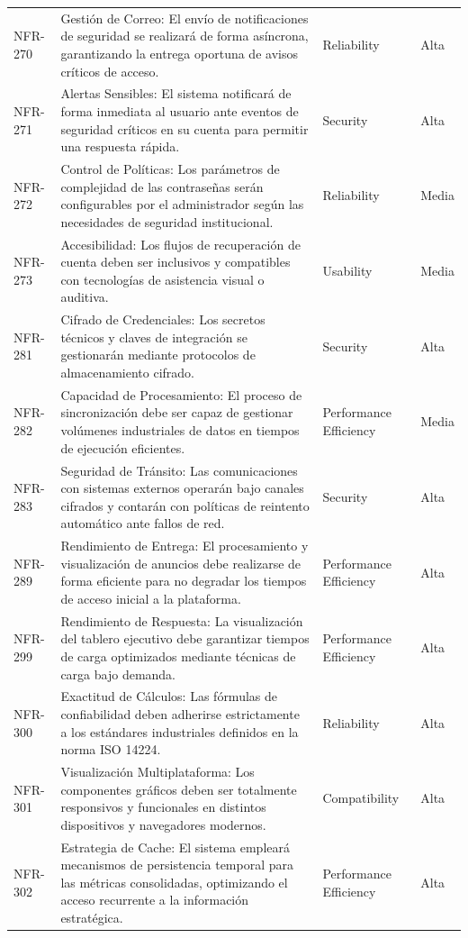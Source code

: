 \begin{longtable}{>{\raggedright\arraybackslash}p{} >{\raggedright\arraybackslash}p{} >{\raggedright\arraybackslash}p{} >{\raggedright\arraybackslash}p{}}
NFR-270 & Gestión de Correo: El envío de notificaciones de seguridad se realizará de forma asíncrona, garantizando la entrega oportuna de avisos críticos de acceso. & Reliability & Alta \\
NFR-271 & Alertas Sensibles: El sistema notificará de forma inmediata al usuario ante eventos de seguridad críticos en su cuenta para permitir una respuesta rápida. & Security & Alta \\
NFR-272 & Control de Políticas: Los parámetros de complejidad de las contraseñas serán configurables por el administrador según las necesidades de seguridad institucional. & Reliability & Media \\
NFR-273 & Accesibilidad: Los flujos de recuperación de cuenta deben ser inclusivos y compatibles con tecnologías de asistencia visual o auditiva. & Usability & Media \\
NFR-281 & Cifrado de Credenciales: Los secretos técnicos y claves de integración se gestionarán mediante protocolos de almacenamiento cifrado. & Security & Alta \\
NFR-282 & Capacidad de Procesamiento: El proceso de sincronización debe ser capaz de gestionar volúmenes industriales de datos en tiempos de ejecución eficientes. & Performance Efficiency & Media \\
NFR-283 & Seguridad de Tránsito: Las comunicaciones con sistemas externos operarán bajo canales cifrados y contarán con políticas de reintento automático ante fallos de red. & Security & Alta \\
NFR-289 & Rendimiento de Entrega: El procesamiento y visualización de anuncios debe realizarse de forma eficiente para no degradar los tiempos de acceso inicial a la plataforma. & Performance Efficiency & Alta \\
NFR-299 & Rendimiento de Respuesta: La visualización del tablero ejecutivo debe garantizar tiempos de carga optimizados mediante técnicas de carga bajo demanda. & Performance Efficiency & Alta \\
NFR-300 & Exactitud de Cálculos: Las fórmulas de confiabilidad deben adherirse estrictamente a los estándares industriales definidos en la norma ISO 14224. & Reliability & Alta \\
NFR-301 & Visualización Multiplataforma: Los componentes gráficos deben ser totalmente responsivos y funcionales en distintos dispositivos y navegadores modernos. & Compatibility & Alta \\
NFR-302 & Estrategia de Cache: El sistema empleará mecanismos de persistencia temporal para las métricas consolidadas, optimizando el acceso recurrente a la información estratégica. & Performance Efficiency & Alta \\

\end{longtable}
